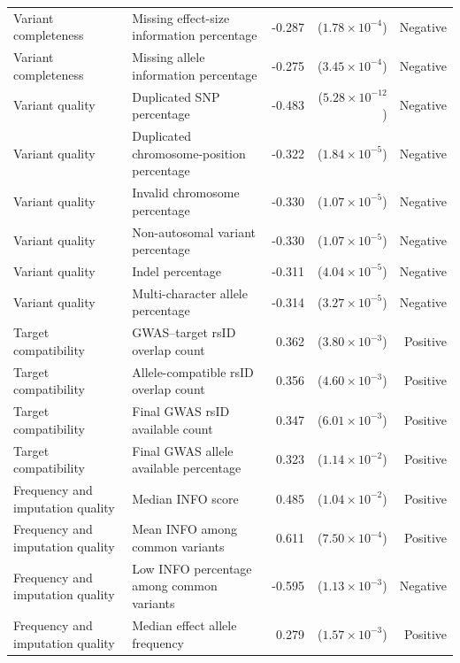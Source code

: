 \documentclass[11pt,a4paper]{article}
\begin{document}
\begin{table}[htbp]
\begin{tabular}{p{} p{} r r r}
Variant completeness & Missing effect-size information percentage & -0.287 & ($1.78 \times 10^{-4}$) & Negative \\
Variant completeness & Missing allele information percentage & -0.275 & ($3.45 \times 10^{-4}$) & Negative \\
Variant quality & Duplicated SNP percentage & -0.483 & ($5.28 \times 10^{-12}$) & Negative \\
Variant quality & Duplicated chromosome-position percentage & -0.322 & ($1.84 \times 10^{-5}$) & Negative \\
Variant quality & Invalid chromosome percentage & -0.330 & ($1.07 \times 10^{-5}$) & Negative \\
Variant quality & Non-autosomal variant percentage & -0.330 & ($1.07 \times 10^{-5}$) & Negative \\
Variant quality & Indel percentage & -0.311 & ($4.04 \times 10^{-5}$) & Negative \\
Variant quality & Multi-character allele percentage & -0.314 & ($3.27 \times 10^{-5}$) & Negative \\
Target compatibility & GWAS--target rsID overlap count & 0.362 & ($3.80 \times 10^{-3}$) & Positive \\
Target compatibility & Allele-compatible rsID overlap count & 0.356 & ($4.60 \times 10^{-3}$) & Positive \\
Target compatibility & Final GWAS rsID available count & 0.347 & ($6.01 \times 10^{-3}$) & Positive \\
Target compatibility & Final GWAS allele available percentage & 0.323 & ($1.14 \times 10^{-2}$) & Positive \\
Frequency and imputation quality & Median INFO score & 0.485 & ($1.04 \times 10^{-2}$) & Positive \\
Frequency and imputation quality & Mean INFO among common variants & 0.611 & ($7.50 \times 10^{-4}$) & Positive \\
Frequency and imputation quality & Low INFO percentage among common variants & -0.595 & ($1.13 \times 10^{-3}$) & Negative \\
Frequency and imputation quality & Median effect allele frequency & 0.279 & ($1.57 \times 10^{-3}$) & Positive \\
\bottomrule
\end{tabular}
\end{table}
\end{document}
